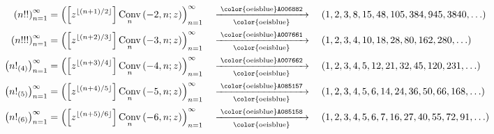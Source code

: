 \documentclass[12pt,reqno]{article}
\numberwithin{sfootnote}{section}
\numberwithin{equation}{section}
\theoremstyle{DefaultTheoremStyle}
\theoremstyle{definition}
\newcommand{\OEISII}[1]{{\color{oeisblue}\texttt{#1}}}
\newcommand{\seqmapsto}[2][]{%
     \xrightarrow[\text{ \OEISII{#1} }]{\text{ \OEISII{#2} }}\quad%
}
\newcommand{\MultiFactorial}[2]{\ensuremath{#1!_{\left(#2\right)}}}
\newcommand{\ConvGF}[4]{\ensuremath{\Conv_{#1}\left(#2, #3; #4\right)}}
\DeclareMathOperator{\Conv}{Conv}
\begin{document}
\begin{align*} 
\left( n!! \right)_{n=1}^{\infty} & = \left( 
     \left[z^{\lfloor (n+1) / 2 \rfloor}\right] 
     \ConvGF{n}{-2}{n}{z} 
     \right)_{n=1}^{\infty} && %
     \seqmapsto{A006882} 
     \left(1, 2, 3, 8, 15, 48, 105, 384, 945, 3840, \ldots\right) \\ 
\left( n!!! \right)_{n=1}^{\infty} & = \left( 
     \left[z^{\lfloor (n+2) / 3 \rfloor}\right] 
     \ConvGF{n}{-3}{n}{z} 
     \right)_{n=1}^{\infty} && %
     \seqmapsto{A007661} 
     \left(1, 2, 3, 4, 10, 18, 28, 80, 162, 280, \ldots\right) \\ 
\left( \MultiFactorial{n}{4} \right)_{n=1}^{\infty} & = 
     \left( 
     \left[z^{\lfloor (n+3) / 4 \rfloor}\right] 
     \ConvGF{n}{-4}{n}{z} 
     \right)_{n=1}^{\infty} && %
     \seqmapsto{A007662} 
     \left(1, 2, 3, 4, 5, 12, 21, 32, 45, 120, 231, \ldots\right) \\ 
\left( \MultiFactorial{n}{5} \right)_{n=1}^{\infty} & = 
     \left( 
     \left[z^{\lfloor (n+4) / 5 \rfloor}\right] 
     \ConvGF{n}{-5}{n}{z} 
     \right)_{n=1}^{\infty} && %
     \seqmapsto{A085157} 
     \left(1, 2, 3, 4, 5, 6, 14, 24, 36, 50, 66, 168, \ldots\right) \\ 
\left( \MultiFactorial{n}{6} \right)_{n=1}^{\infty} & = 
     \left( 
     \left[z^{\lfloor (n+5) / 6 \rfloor}\right] 
     \ConvGF{n}{-6}{n}{z} 
     \right)_{n=1}^{\infty} && %
     \seqmapsto{A085158} 
     \left(1, 2, 3, 4, 5, 6, 7, 16, 27, 40, 55, 72, 91, \ldots\right) 
\end{align*} 
\end{document}
